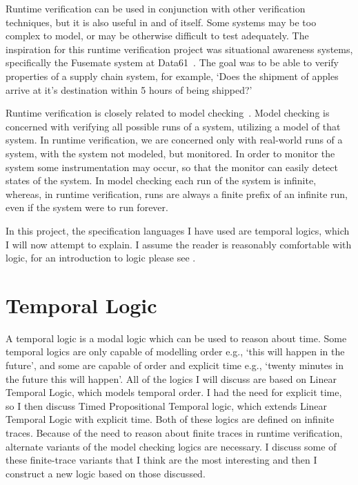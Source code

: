 \documentclass[a4paper]{article}
\begin{document}
Runtime verification can be used in conjunction with other verification techniques, but it is also useful in and of itself. Some systems may be too complex to model, or may be otherwise difficult to test adequately. The inspiration for this runtime verification project was situational awareness systems, specifically the Fusemate system at Data61~\autocite{Baumgartner:Haslum:situational-awareness-industrial-operations:ASOR:2018}. The goal was to be able to verify properties of a supply chain system, for example, `Does the shipment of apples arrive at it's destination within 5 hours of being shipped?'

Runtime verification is closely related to model checking~\autocite{baier2008principles}. Model checking is concerned with verifying all possible runs of a system, utilizing a model of that system. In runtime verification, we are concerned only with real-world runs of a system, with the system not modeled, but monitored. In order to monitor the system some instrumentation may occur, so that the monitor can easily detect states of the system. In model checking each run of the system is infinite, whereas, in runtime verification, runs are always a finite prefix of an infinite run, even if the system were to run forever.

In this project, the specification languages I have used are temporal logics, which I will now attempt to explain. I assume the reader is reasonably comfortable with logic, for an introduction to logic please see \textcite{bradley2007calculus}.

\section{Temporal Logic}

A temporal logic is a modal logic which can be used to reason about time. Some temporal logics are only capable of modelling order e.g., `this will happen in the future', and some are capable of order and explicit time e.g., `twenty minutes in the future this will happen'. All of the logics I will discuss are based on Linear Temporal Logic, which models temporal order. I had the need for explicit time, so I then discuss Timed Propositional Temporal logic, which extends Linear Temporal Logic with explicit time. Both of these logics are defined on infinite traces. Because of the need to reason about finite traces in runtime verification, alternate variants of the model checking logics are necessary. I discuss some of these finite-trace variants that I think are the most interesting and then I construct a new logic based on those discussed.
\end{document}
